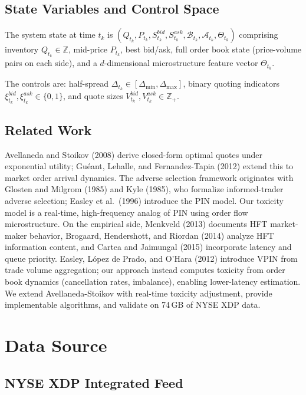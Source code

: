 \documentclass[11pt]{article}
\theoremstyle{definition}
\begin{document}
\subsection{State Variables and Control Space}

The system state at time $t_k$ is $(Q_{t_k}, P_{t_k}, S_{t_k}^{bid}, S_{t_k}^{ask}, \mathcal{B}_{t_k}, \mathcal{A}_{t_k}, \Theta_{t_k})$ comprising inventory $Q_{t_k} \in \mathbb{Z}$, mid-price $P_{t_k}$, best bid/ask, full order book state (price-volume pairs on each side), and a $d$-dimensional microstructure feature vector $\Theta_{t_k}$.

The controls are: half-spread $\Delta_{t_k} \in [\Delta_{\min}, \Delta_{\max}]$, binary quoting indicators $\xi_{t_k}^{bid}, \xi_{t_k}^{ask} \in \{0, 1\}$, and quote sizes $V_{t_k}^{bid}, V_{t_k}^{ask} \in \mathbb{Z}_+$.

\subsection{Related Work}

Avellaneda and Stoikov (2008) derive closed-form optimal quotes under exponential utility; Gu\'{e}ant, Lehalle, and Fernandez-Tapia (2012) extend this to market order arrival dynamics. The adverse selection framework originates with Glosten and Milgrom (1985) and Kyle (1985), who formalize informed-trader adverse selection; Easley et al.\ (1996) introduce the PIN model. Our toxicity model is a real-time, high-frequency analog of PIN using order flow microstructure. On the empirical side, Menkveld (2013) documents HFT market-maker behavior, Brogaard, Hendershott, and Riordan (2014) analyze HFT information content, and Cartea and Jaimungal (2015) incorporate latency and queue priority. Easley, L\'{o}pez de Prado, and O'Hara (2012) introduce VPIN from trade volume aggregation; our approach instead computes toxicity from order book dynamics (cancellation rates, imbalance), enabling lower-latency estimation. We extend Avellaneda-Stoikov with real-time toxicity adjustment, provide implementable algorithms, and validate on 74\,GB of NYSE XDP data.

\section{Data Source}

\subsection{NYSE XDP Integrated Feed}
\end{document}
